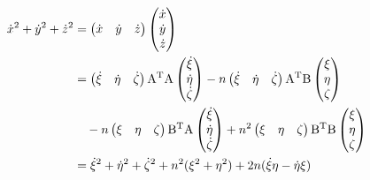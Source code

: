 \documentclass[11pt,a4paper,oneside,onecolumn]{jarticle}
\begin{document}
\begin{equation}
\begin{split}
\dot{x}^2 + \dot{y}^2 + \dot{z}^2 & = 
\begin{pmatrix}
\dot{x} & \dot{y} & \dot{z}\\
\end{pmatrix}
\begin{pmatrix}
\dot{x}\\
\dot{y}\\
\dot{z}\\
\end{pmatrix}\\
& = 
\begin{pmatrix}
\dot{\xi} & \dot{\eta} & \dot{\zeta}\\
\end{pmatrix}
{\rm A}^{\rm T} {\rm A} 
\begin{pmatrix}
\dot{\xi}\\
\dot{\eta}\\
\dot{\zeta}\\
\end{pmatrix}
- n
\begin{pmatrix}
\dot{\xi} & \dot{\eta} & \dot{\zeta}\\
\end{pmatrix}
{\rm A}^{\rm T} {\rm B} 
\begin{pmatrix}
\xi\\
\eta\\
\zeta\\
\end{pmatrix}\\
& \quad - n
\begin{pmatrix}
\xi & \eta & \zeta\\
\end{pmatrix}
{\rm B}^{\rm T} {\rm A}
 \begin{pmatrix}
\dot{\xi}\\
\dot{\eta}\\
\dot{\zeta}\\
\end{pmatrix}
+ n^2 
\begin{pmatrix}
\xi & \eta & \zeta\\
\end{pmatrix}
{\rm B}^{\rm T} {\rm B}
\begin{pmatrix}
\xi\\
\eta\\
\zeta\\
\end{pmatrix}\\
& =  \dot{\xi}^2 + \dot{\eta}^2 + \dot{\zeta}^2 + n^2 (\xi^2 + \eta^2) + 2 n (\dot{\xi} \eta - \dot{\eta} \xi)
\end{split}
\end{equation}
\end{document}
